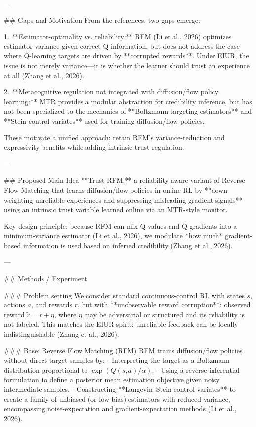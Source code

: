 ---

## Gaps and Motivation  
From the references, two gaps emerge:

1. **Estimator-optimality vs. reliability:** RFM (Li et al., 2026) optimizes estimator variance given correct Q information, but does not address the case where Q-learning targets are driven by **corrupted rewards**. Under EIUR, the issue is not merely variance—it is whether the learner should trust an experience at all (Zhang et al., 2026).

2. **Metacognitive regulation not integrated with diffusion/flow policy learning:** MTR provides a modular abstraction for credibility inference, but has not been specialized to the mechanics of **Boltzmann-targeting estimators** and **Stein control variates** used for training diffusion/flow policies.

These motivate a unified approach: retain RFM’s variance-reduction and expressivity benefits while adding intrinsic trust regulation.

---

## Proposed Main Idea  
**Trust-RFM:** a reliability-aware variant of Reverse Flow Matching that learns diffusion/flow policies in online RL by **down-weighting unreliable experiences and suppressing misleading gradient signals** using an intrinsic trust variable learned online via an MTR-style monitor.

Key design principle: because RFM can mix Q-values and Q-gradients into a minimum-variance estimator (Li et al., 2026), we modulate *how much* gradient-based information is used based on inferred credibility (Zhang et al., 2026).

---

## Methods / Experiment  

### Problem setting  
We consider standard continuous-control RL with states \(s\), actions \(a\), and rewards \(r\), but with **unobservable reward corruption**: observed reward \(\tilde r = r + \eta\), where \(\eta\) may be adversarial or structured and its reliability is not labeled. This matches the EIUR spirit: unreliable feedback can be locally indistinguishable (Zhang et al., 2026).

### Base: Reverse Flow Matching (RFM)  
RFM trains diffusion/flow policies without direct target samples by:
- Interpreting the target as a Boltzmann distribution proportional to \(\exp(Q(s,a)/\alpha)\).
- Using a reverse inferential formulation to define a posterior mean estimation objective given noisy intermediate samples.
- Constructing **Langevin–Stein control variates** to create a family of unbiased (or low-bias) estimators with reduced variance, encompassing noise-expectation and gradient-expectation methods (Li et al., 2026).

